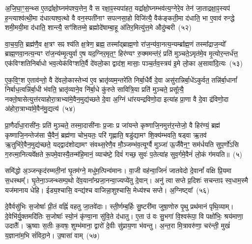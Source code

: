 अ॒जि॒घा॒ꣳ॒स॒न्थ्स ए॒तद्रा᳚क्षो॒घ्नम॑पश्य॒त्तेन॒ वै स रक्षा॒ꣴ॒स्यपा॑हत॒ यद्रा᳚क्षो॒घ्नम्भव॑त्य॒ग्नेरे॒व तेन॑ जा॒ताद्रक्षा॒ꣴ॒स्यप॑ ह॒न्त्याश्व॑त्थी॒मा द॑धात्यश्व॒त्थो वै वन॒स्पती॑नाꣳ सपत्नसा॒हो विजि॑त्यै॒ वैक॑ङ्कती॒मा द॑धाति॒ भा ए॒वाव॑ रुन्द्धे शमी॒मयी॒मा द॑धाति॒ शान्त्यै॒ सꣳ॑शितम्मे॒ ब्रह्मोदे॑षाम्बा॒हू अ॑तिर॒मित्यु॑त्त॒मे औदु॑म्बरी~(५२)

वा॒च॒य॒ति॒ ब्रह्म॑णै॒व क्ष॒त्रꣳ सꣴ श्य॑ति क्ष॒त्रेण॒ ब्रह्म॒ तस्मा᳚द्ब्राह्म॒णो रा॑ज॒न्य॑वा॒नत्य॒न्यम्ब्रा᳚ह्म॒णं तस्मा᳚द्राज॒न्यो᳚ ब्राह्म॒णवा॒नत्य॒न्यꣳ रा॑ज॒न्य॑म्मृ॒त्युर्वा ए॒ष यद॒ग्निर॒मृत॒ꣳ॒ हिर॑ण्यꣳ रु॒क्ममन्त॑रं॒ प्रति॑ मुञ्चते॒\-ऽमृत॑मे॒व मृ॒त्योर॒न्तर्ध॑त्त॒ एक॑विꣳशतिनिर्बाधो भव॒त्येक॑विꣳशति॒र्वै दे॑वलो॒का द्वाद॑श॒ मासाः॒ पञ्च॒र्तव॒स्त्रय॑ इ॒मे लो॒का अ॒सावा॑दि॒त्यः~(५३)

ए॒क॒वि॒ꣳ॒श ए॒ताव॑न्तो॒ वै दे॑वलो॒कास्तेभ्य॑ ए॒व भ्रातृ॑व्यम॒न्तरे॑ति निर्बा॒धैर्वै दे॒वा असु॑रान्निर्बा॒धे॑\-ऽकुर्वत॒ तन्नि॑र्बा॒धानां᳚ निर्बाध॒त्वन्नि॑र्बा॒धी भ॑वति॒ भ्रातृ॑व्याने॒व नि॑र्बा॒धे कु॑रुते सावित्रि॒या प्रति॑ मुञ्चते॒ प्रसू᳚त्यै॒ नक्तो॒षासेत्युत्त॑रयाहोरा॒त्राभ्या॑\-मे॒वैन॒मुद्य॑च्छते दे॒वा अ॒ग्निं धा॑रयन्द्रविणो॒दा इत्या॑ह प्रा॒णा वै दे॒वा द्र॑विणो॒दा अ॑होरा॒त्राभ्या॑मे॒वैन॑मु॒द्यत्य॑~(५४)

प्रा॒णैर्दा॑धा॒रासी॑नः॒ प्रति॑ मुञ्चते॒ तस्मा॒दासी॑नाः प्र॒जाः प्र जा॑यन्ते कृष्णाजि॒नमुत्त॑र॒न्तेजो॒ वै हिर॑ण्यं॒ ब्रह्म॑ कृष्णाजि॒नन्तेज॑सा चै॒वैनं॒ ब्रह्म॑णा चोभ॒यतः॒ परि॑ गृह्णाति॒ षडु॑द्यामꣳ शि॒क्य॑म्भवति॒ षड्वा ऋ॒तव॑ ऋ॒तुभि॑रे॒वैन॒मुद्य॑च्छते॒ यद्द्वाद॑शोद्यामꣳ संवथ्स॒रेणै॒व मौ॒ञ्जम्भ॑व॒त्यूर्ग्वै मुञ्जा॑ ऊ॒र्जैवैन॒ꣳ॒ सम॑र्धयति सुप॒र्णो॑\-ऽसि ग॒रुत्मा॒नित्यवे᳚क्षते रू॒पमे॒वास्यै॒तन्म॑हि॒मानं॒ व्याच॑ष्टे॒ दिवं॑ गच्छ॒ सुवः॑ प॒तेत्या॑ह सुव॒र्गमे॒वैनं॑ लो॒कं ग॑मयति॥~(५)

{\anuvakamend[{रक्षा॒ꣴ॒स्यौदु॑म्बरी आदि॒त्य उ॒द्यत्य॒ स़ञ्चतु॑र्विꣳशतिश्च}]}%

समि॑द्धो अ॒ञ्जन्कृद॑रम्मती॒नां घृ॒तम॑ग्ने॒ मधु॑म॒त्पिन्व॑मानः। वा॒जी वह॑न्वा॒जिनं॑ जातवेदो दे॒वानां᳚ वक्षि प्रि॒यमा स॒धस्थम्᳚। घृ॒तेना॒ञ्जन्थ्सम्प॒थो दे॑व॒याना᳚न्प्रजा॒नन्वा॒ज्यप्ये॑तु दे॒वान्। अनु॑ त्वा सप्ते प्र॒दिशः॑ सचन्ताꣴ स्व॒धाम॒स्मै यज॑मानाय धेहि। ईड्य॒श्चासि॒ वन्द्य॑श्च वाजिन्ना॒शुश्चासि॒ मेध्य॑श्च सप्ते। अ॒ग्निष्ट्वा᳚~(५६)

दे॒वैर्वसु॑भिः स॒जोषाः᳚ प्री॒तं वह्निं॑ वहतु जा॒तवे॑दाः। स्ती॒र्णम्ब॒र्\mbox{}हिः सु॒ष्टरी॑मा जुषा॒णोरु पृ॒थु प्रथ॑मानं पृथि॒व्याम्। दे॒वेभि॑र्यु॒क्तमदि॑तिः स॒जोषाः᳚ स्यो॒नं कृ॑ण्वा॒ना सु॑वि॒ते द॑धातु। ए॒ता उ॑ वः सु॒भगा॑ वि॒श्वरू॑पा॒ वि पक्षो॑भिः॒ श्रय॑माणा॒ उदातैः᳚। ऋ॒ष्वाः स॒तीः क॒वषः॒ शुम्भ॑माना॒ द्वारो॑ दे॒वीः सु॑प्राय॒णा भ॑वन्तु। अ॒न्त॒रा मि॒त्रावरु॑णा॒ चर॑न्ती॒ मुखं॑ य॒ज्ञाना॑म॒भि सं॑विदा॒ने। उ॒षासा॑ वाम्~(५७)

